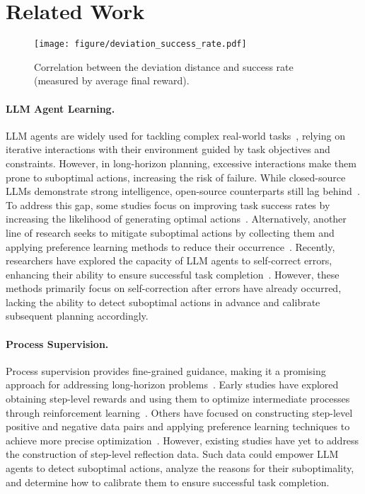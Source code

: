 \section{Related Work}

\begin{figure}[t!]
  \texttt{[image: figure/deviation\_success\_rate.pdf]}
  \caption{Correlation between the deviation distance and success rate (measured by average final reward).
  }
  \label{fig:deviation_success_rate}
\end{figure}

\paragraph{LLM Agent Learning.}
LLM agents are widely used for tackling complex real-world tasks~\citep{wang2023voyager,hu2024dawn,wang-etal-2024-e2cl}, relying on iterative interactions with their environment guided by task objectives and constraints. However, in long-horizon planning, excessive interactions make them prone to suboptimal actions, increasing the risk of failure. While closed-source LLMs demonstrate strong intelligence, open-source counterparts still lag behind~\citep{liu2023agentbench,wang2023mint}.
To address this gap, some studies focus on improving task success rates by increasing the likelihood of generating optimal actions~\citep{chen2023fireact, yuan2023scaling}. Alternatively, another line of research seeks to mitigate suboptimal actions by collecting them and applying preference learning methods to reduce their occurrence~\citep{song2024trial,xiong2024watch}.
Recently, researchers have explored the capacity of LLM agents to self-correct errors, enhancing their ability to ensure successful task completion~\citep{wang-etal-2024-e2cl, qu2024recursive}.
However, these methods primarily focus on self-correction after errors have already occurred, lacking the ability to detect suboptimal actions in advance and calibrate subsequent planning accordingly.

\paragraph{Process Supervision.}
 
Process supervision provides fine-grained guidance, making it a promising approach for addressing long-horizon problems~\citep{uesato2022solving}. Early studies have explored obtaining step-level rewards and using them to optimize intermediate processes through reinforcement learning~\citep{lightman2023let, deng2024novice, wang-etal-2024-math}. Others have focused on constructing step-level positive and negative data pairs and applying preference learning techniques to achieve more precise optimization~\citep{xiong2024watch, jiao2024learning}.
However, existing studies have yet to address the construction of step-level reflection data. Such data could empower LLM agents to detect suboptimal actions, analyze the reasons for their suboptimality, and determine how to calibrate them to ensure successful task completion.
